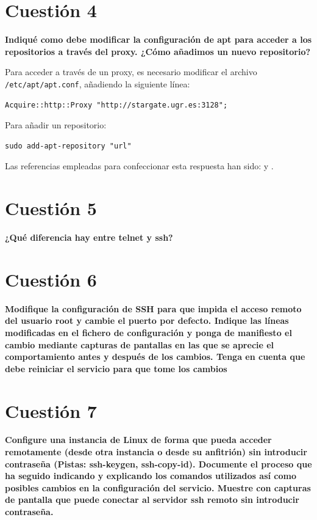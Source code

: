 \documentclass[a4paper,11pt]{article}
\newenvironment{answer}{%
\begin{list}{}{%
}%
\item[]}{\end{list}}
\begin{document}
\section{Cuestión 4}
\textbf{Indiqué como debe modificar la configuración de apt para acceder a los repositorios a través del proxy. ¿Cómo 
añadimos un nuevo repositorio?}
\begin{answer}
  Para acceder a través de un proxy, es necesario modificar el archivo \texttt{/etc/apt/apt.conf},
  añadiendo la siguiente línea:
  \begin{lstlisting}[style=BashInputStyle]
  Acquire::http::Proxy "http://stargate.ugr.es:3128";
  \end{lstlisting}
  Para añadir un repositorio:
  \begin{lstlisting}[style=BashInputStyle]
  sudo add-apt-repository "url"
  \end{lstlisting}
  
  Las referencias empleadas para confeccionar esta respuesta han sido: \cite{aptproxy} y
  \cite{aptrepo}.
\end{answer}

\section{Cuestión 5}
\textbf{¿Qué diferencia hay entre telnet y ssh?}
\begin{answer}
  
\end{answer}

\section{Cuestión 6}
\textbf{Modifique la configuración de SSH para que impida el acceso remoto del usuario root y cambie el puerto por defecto. 
Indique las líneas modificadas en el fichero de configuración y ponga de manifiesto el cambio mediante capturas de 
pantallas en las que se aprecie el  comportamiento antes y después de los cambios. Tenga en cuenta que debe reiniciar 
el servicio para que tome los cambios}
\begin{answer}
  
\end{answer}

\section{Cuestión 7}
\textbf{Configure una instancia de Linux de forma que pueda acceder remotamente (desde otra instancia o desde su anfitrión) 
sin introducir contraseña (Pistas: ssh-keygen, ssh-copy-id). Documente el proceso que ha seguido indicando y explicando los
comandos utilizados así como posibles cambios en la configuración del servicio. Muestre con capturas de pantalla que puede 
conectar al servidor ssh remoto sin introducir contraseña.}
\begin{answer}
  
\end{answer}
\end{document}
